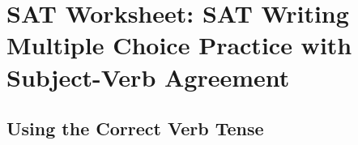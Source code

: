 \section{SAT Worksheet: SAT Writing Multiple Choice Practice with Subject-Verb Agreement}
\subsection{Using the Correct Verb Tense}